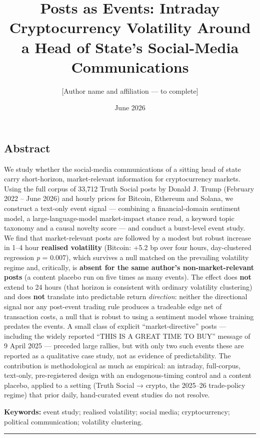 \documentclass[
]{article}
\title{Posts as Events: Intraday Cryptocurrency Volatility Around a Head
of State's Social-Media Communications}
\author{{[}Author name and affiliation --- to complete{]}}
\date{June 2026}
\begin{document}
\maketitle

\subsection{Abstract}\label{abstract}

We study whether the social-media communications of a sitting head of
state carry short-horizon, market-relevant information for
cryptocurrency markets. Using the full corpus of 33,712 Truth Social
posts by Donald J. Trump (February 2022 -- June 2026) and hourly prices
for Bitcoin, Ethereum and Solana, we construct a text-only event signal
--- combining a financial-domain sentiment model, a large-language-model
market-impact stance read, a keyword topic taxonomy and a causal novelty
score --- and conduct a burst-level event study. We find that
market-relevant posts are followed by a modest but robust increase in
1--4 hour \textbf{realised volatility} (Bitcoin: +5.2 bp over four
hours, day-clustered regression \emph{p} = 0.007), which survives a null
matched on the prevailing volatility regime and, critically, is
\textbf{absent for the same author's non-market-relevant posts} (a
content placebo run on five times as many events). The effect does
\textbf{not} extend to 24 hours (that horizon is consistent with
ordinary volatility clustering) and does \textbf{not} translate into
predictable return \emph{direction}: neither the directional signal nor
any post-event trading rule produces a tradeable edge net of transaction
costs, a null that is robust to using a sentiment model whose training
predates the events. A small class of explicit ``market-directive''
posts --- including the widely reported ``THIS IS A GREAT TIME TO BUY''
message of 9 April 2025 --- preceded large rallies, but with only two
such events these are reported as a qualitative case study, not as
evidence of predictability. The contribution is methodological as much
as empirical: an intraday, full-corpus, text-only, pre-registered design
with an endogenous-timing control and a content placebo, applied to a
setting (Truth Social → crypto, the 2025--26 trade-policy regime) that
prior daily, hand-curated event studies do not resolve.

\textbf{Keywords:} event study; realised volatility; social media;
cryptocurrency; political communication; volatility clustering.

\begin{center}\rule{0.5\linewidth}{0.5pt}\end{center}
\end{document}
